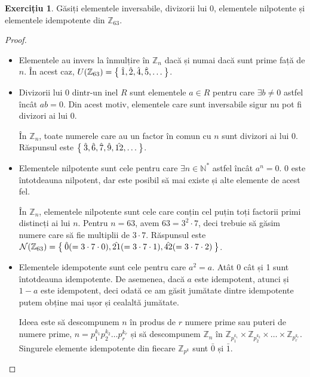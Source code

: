 \documentclass[11pt]{article}
\theoremstyle{definition}
\newtheorem*{exercise}{Exercițiu}
\begin{document}
\begin{exercise}
Găsiți elementele inversabile, divizorii lui 0, elementele nilpotente și elementele idempotente din \(\mathbb{Z}_{63}\).
\end{exercise}
\begin{proof}
~
\begin{itemize}
    \item Elementele au invers la înmulțire în \(\mathbb{Z}_n\) dacă și numai dacă sunt prime față de \(n\). În acest caz, \(U(\mathbb{Z}_{63}) = \Set{ \hat{1}, \hat{2}, \hat{4}, \hat{5}, \dots }\).
    
    \item Divizorii lui 0 dintr-un inel \(R\) sunt elementele \(a \in R\) pentru care \(\exists b \neq 0\) astfel încât \(ab = 0\). Din acest motiv, elementele care sunt inversabile sigur nu pot fi divizori ai lui 0.

    În \(\mathbb{Z}_n\), toate numerele care au un factor în comun cu \(n\) sunt divizori ai lui 0. Răspunsul este \(\Set{ \hat{3}, \hat{6}, \hat{7}, \hat{9}, \hat{12}, \dots }\).
    
    \item Elementele nilpotente sunt cele pentru care \(\exists n \in \mathbb{N}^*\) astfel încât \(a^n = 0\). 0 este întotdeauna nilpotent, dar este posibil să mai existe și alte elemente de acest fel.
    
    În \(\mathbb{Z}_n\), elementele nilpotente sunt cele care conțin cel puțin toți factorii primi distincți ai lui \(n\). Pentru \(n = 63\), avem \(63 = 3^2 \cdot 7\), deci trebuie să găsim numere care să fie multiplii de \(3 \cdot 7\). Răspunsul este \(\mathcal{N}(\mathbb{Z}_{63}) = \Set{ \hat{0} (= 3 \cdot 7 \cdot 0), \hat{21} (= 3 \cdot 7 \cdot 1), \hat{42} (= 3 \cdot 7 \cdot 2) }\).
    
    \item Elementele idempotente sunt cele pentru care \(a^2 = a\). Atât 0 cât și 1 sunt întotdeauna idempotente. De asemenea, dacă \(a\) este idempotent, atunci și \(1 - a\) este idempotent, deci odată ce am găsit jumătate dintre idempotente putem obține mai ușor și cealaltă jumătate.
    
    Ideea este să descompunem \(n\) în produs de \(r\) numere prime sau puteri de numere prime, \(n = p_1^{k_1} p_2^{k_2} \dots p_r^{k_r}\) și să descompunem \(\mathbb{Z}_n\) în \(\mathbb{Z}_{p_1^{k_1}} \times \mathbb{Z}_{p_2^{k_2}} \times \dots \times \mathbb{Z}_{p_r^{k_r}}\).
    Singurele elemente idempotente din fiecare \(\mathbb{Z}_{p^k}\) sunt \(\bar{0}\) și \(\bar{1}\).
    

\end{itemize}
\end{proof}
\end{document}
